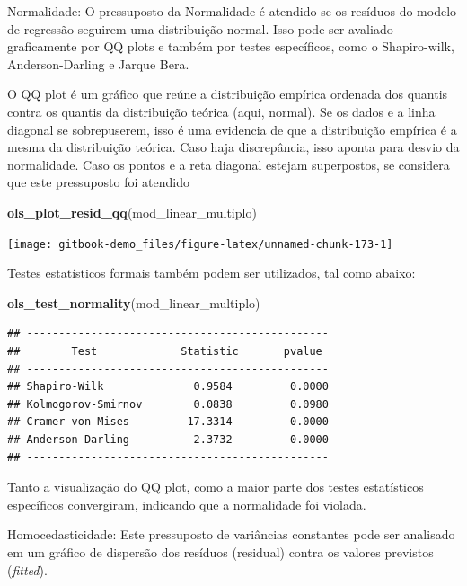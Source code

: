 \documentclass[
]{book}
\newenvironment{Shaded}{\begin{snugshade}}{\end{snugshade}}
\newcommand{\KeywordTok}[1]{\textcolor[rgb]{0.13,0.29,0.53}{\textbf{#1}}}
\newcommand{\NormalTok}[1]{#1}
\begin{document}
Normalidade: O pressuposto da Normalidade é atendido se os resíduos do modelo de regressão seguirem uma distribuição normal. Isso pode ser avaliado graficamente por QQ plots e também por testes específicos, como o Shapiro-wilk, Anderson-Darling e Jarque Bera.

O QQ plot é um gráfico que reúne a distribuição empírica ordenada dos quantis contra os quantis da distribuição teórica (aqui, normal). Se os dados e a linha diagonal se sobrepuserem, isso é uma evidencia de que a distribuição empírica é a mesma da distribuição teórica. Caso haja discrepância, isso aponta para desvio da normalidade. Caso os pontos e a reta diagonal estejam superpostos, se considera que este pressuposto foi atendido

\begin{Shaded}
\begin{Highlighting}[]
\KeywordTok{ols_plot_resid_qq}\NormalTok{(mod_linear_multiplo)}
\end{Highlighting}
\end{Shaded}

\begin{center}\texttt{[image: gitbook-demo\_files/figure-latex/unnamed-chunk-173-1]} \end{center}

Testes estatísticos formais também podem ser utilizados, tal como abaixo:

\begin{Shaded}
\begin{Highlighting}[]
\KeywordTok{ols_test_normality}\NormalTok{(mod_linear_multiplo)}
\end{Highlighting}
\end{Shaded}

\begin{verbatim}
## -----------------------------------------------
##        Test             Statistic       pvalue  
## -----------------------------------------------
## Shapiro-Wilk              0.9584         0.0000 
## Kolmogorov-Smirnov        0.0838         0.0980 
## Cramer-von Mises         17.3314         0.0000 
## Anderson-Darling          2.3732         0.0000 
## -----------------------------------------------
\end{verbatim}

Tanto a visualização do QQ plot, como a maior parte dos testes estatísticos específicos convergiram, indicando que a normalidade foi violada.

Homocedasticidade: Este pressuposto de variâncias constantes pode ser analisado em um gráfico de dispersão dos resíduos (residual) contra os valores previstos (\emph{fitted}).
\end{document}
